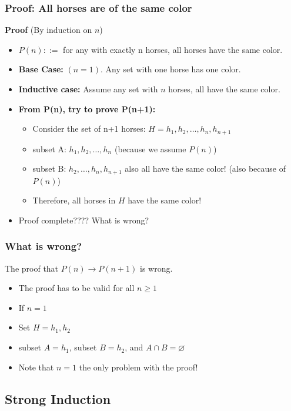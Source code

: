 \documentclass{beamer}
\begin{document}
\begin{frame}
  \frametitle{Proof: All horses are of the same color}

  {\bf Proof} (By induction on $n$)
  {\large
  \begin{itemize}
  \item<2-> $P(n) ::=$ for any  with \alert{exactly n
    horses}, all horses have the same color.
  \item<3-> {\bf Base Case:} $(n = 1)$. Any set with one horse has one color.

  \item<4-> {\bf Inductive case:} Assume any set with $n$ horses, all
    have the same color.
  \item<5-> {\bf From P(n), try to prove P(n+1):}
    \begin{itemize}
    \item <5->Consider the set of n+1 horses: $H = h_1, h_2, \ldots, h_n, h_{n+1}$
    \item <6->subset A: $h_1, h_2, \ldots, h_n$  (because we assume $P(n)$)
    \item <7->subset B: $h_2, \ldots, h_n, h_{n+1}$ \alert{also} all have the same color! (also because of $P(n)$)
    \item <8->Therefore, all horses in $H$ have the same color!
    \end{itemize}
  \item<9-> Proof complete???? \alert{What is wrong?}
  \end{itemize}
  }
\end{frame}

\begin{frame}
  \frametitle{What is wrong?}

  {\larger
    The proof that $P(n) \rightarrow P(n+1)$ is wrong.
    \begin{itemize}
    \item <2-> The proof has to be valid for all $n \geq 1$
    \item <2-> If $n = 1$
    \item <3-> Set $H = h_1, h_2$
    \item <4-> subset $A = h_1$, subset $B = h_2$, and $A \cap B = \varnothing$
      \vfill
    \item <5-> Note that $n=1$ the \alert{only} problem with the proof!
    \end{itemize}
  }
\end{frame}

\subsection{Strong Induction}
\end{document}
